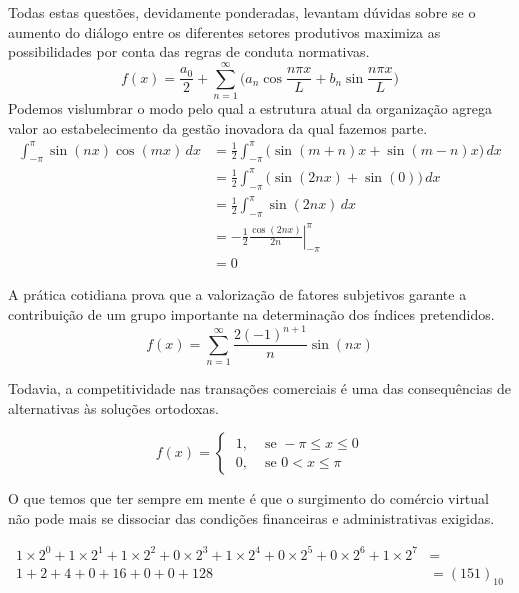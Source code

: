 \begin{apendicesenv}
    Todas estas questões, devidamente ponderadas, levantam dúvidas sobre se o
    aumento do diálogo entre os diferentes setores produtivos maximiza as
    possibilidades por conta das regras de conduta normativas.
    \begin{equation}\label{eq:serie2}
        f(x) = \frac{a_{0}}{2}
        + \sum_{n=1}^{\infty} \Big( a_{n} \cos\frac{n\pi x}{L} + b_{n} \sin\frac{n\pi x}{L} \Big)
    \end{equation}
    Podemos vislumbrar o modo pelo qual a estrutura atual da organização agrega valor ao estabelecimento da gestão inovadora da qual fazemos parte.
    \begin{align*}
        \int_{-\pi}^{\pi} \sin(nx)\cos(mx)\,dx & =\frac{1}{2}\int_{-\pi}^{\pi}\Big(\sin(m+n)x+\sin(m-n)x\Big)\,dx \\[3mm]
                                               & =\frac{1}{2}\int_{-\pi}^{\pi}\Big(\sin(2nx)+\sin(0)\Big)\,dx     \\[3mm]
                                               & =\frac{1}{2}\int_{-\pi}^{\pi}\sin(2nx)\,dx                       \\[3mm]
                                               & =-\left.\frac{1}{2}\frac{\cos(2nx)}{2n}\right|_{-\pi}^{\pi}      \\[3mm]
                                               & =0
    \end{align*}

    A prática cotidiana
    prova que a valorização de fatores subjetivos garante a contribuição de um grupo
    importante na determinação dos índices pretendidos.
    \[
        f(x) = \sum_{n=1}^{\infty} \frac{2(-1)^{n+1}}{n} \sin(nx)
    \]

    Todavia, a competitividade
    nas transações comerciais é uma das consequências de alternativas às soluções
    ortodoxas.

    \[
        f(x) =
        \begin{cases}
            \; 1, & \text{ se }  -\pi \leq x \leq 0 \\
            \; 0, & \text{ se } 0 < x \leq \pi
        \end{cases}
    \]

    O que temos que ter sempre em mente é que o surgimento do comércio
    virtual não pode mais se dissociar das condições financeiras e administrativas
    exigidas.

    \begin{align*}
        1 \!\times\! 2^0 + 1 \!\times\! 2^1 + 1 \!\times\! 2^2 + 0 \!\times\! 2^3 +
        1 \!\times\! 2^4 + 0 \!\times\! 2^5 + 0 \!\times\! 2^6 + 1 \!\times\! 2^7 & =            \\
        1 + 2 + 4 + 0 + 16 + 0 + 0 + 128                                          & = (151)_{10}
    \end{align*}


\end{apendicesenv}

